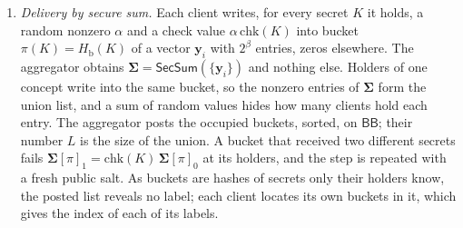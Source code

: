 \begin{enumerate}[label=(\arabic*),leftmargin=*,itemsep=2pt]
\item \emph{Delivery by secure sum.} Each client writes, for every secret $K$ it holds, a random
nonzero $\alpha$ and a check value $\alpha\,\mathrm{chk}(K)$ into bucket $\pi(K)=H_{\mathrm b}(K)$ of
a vector $\mathbf{y}_i$ with $2^\beta$ entries, zeros elsewhere. The aggregator obtains
$\boldsymbol\Sigma=\mathsf{SecSum}(\{\mathbf{y}_i\})$ and nothing else. Holders of one concept write
into the same bucket, so the nonzero entries of $\boldsymbol\Sigma$ form the union list, and a sum of
random values hides how many clients hold each entry. The aggregator posts the occupied buckets,
sorted, on $\mathsf{BB}$; their number $L$ is the size of the union. A bucket that received two
different secrets fails $\boldsymbol\Sigma[\pi]_1=\mathrm{chk}(K)\,\boldsymbol\Sigma[\pi]_0$ at its
holders, and the step is repeated with a fresh public salt. As buckets are hashes of secrets only
their holders know, the posted list reveals no label; each client locates its own buckets in it,
which gives the index of each of its labels.
\end{enumerate}
